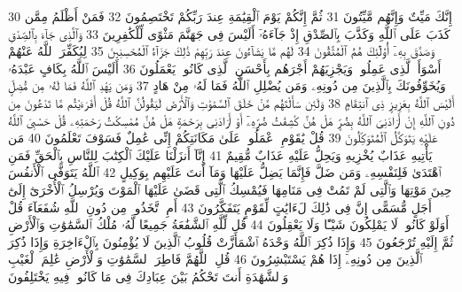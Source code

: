 {\tiny\colorbox{cl_aya}{30}} إِنَّكَ مَيِّتٌ وَإِنَّهُم مَّيِّتُونَ
{\tiny\colorbox{cl_aya}{31}} ثُمَّ إِنَّكُمْ يَوْمَ ٱلْقِيَٰمَةِ عِندَ رَبِّكُمْ تَخْتَصِمُونَ
{\tiny\colorbox{cl_aya}{32}} فَمَنْ أَظْلَمُ مِمَّن كَذَبَ عَلَى ٱللَّهِ وَكَذَّبَ بِٱلصِّدْقِ إِذْ جَآءَهُۥٓ أَلَيْسَ فِى جَهَنَّمَ مَثْوًى لِّلْكَٰفِرِينَ
{\tiny\colorbox{cl_aya}{33}} وَٱلَّذِى جَآءَ بِٱلصِّدْقِ وَصَدَّقَ بِهِۦٓ أُو۟لَٰٓئِكَ هُمُ ٱلْمُتَّقُونَ
{\tiny\colorbox{cl_aya}{34}} لَهُم مَّا يَشَآءُونَ عِندَ رَبِّهِمْ ذَٰلِكَ جَزَآءُ ٱلْمُحْسِنِينَ
{\tiny\colorbox{cl_aya}{35}} لِيُكَفِّرَ ٱللَّهُ عَنْهُمْ أَسْوَأَ ٱلَّذِى عَمِلُوا۟ وَيَجْزِيَهُمْ أَجْرَهُم بِأَحْسَنِ ٱلَّذِى كَانُوا۟ يَعْمَلُونَ
{\tiny\colorbox{cl_aya}{36}} أَلَيْسَ ٱللَّهُ بِكَافٍ عَبْدَهُۥ وَيُخَوِّفُونَكَ بِٱلَّذِينَ مِن دُونِهِۦ وَمَن يُضْلِلِ ٱللَّهُ فَمَا لَهُۥ مِنْ هَادٍ
{\tiny\colorbox{cl_aya}{37}} وَمَن يَهْدِ ٱللَّهُ فَمَا لَهُۥ مِن مُّضِلٍّ أَلَيْسَ ٱللَّهُ بِعَزِيزٍ ذِى ٱنتِقَامٍ
{\tiny\colorbox{cl_aya}{38}} وَلَئِن سَأَلْتَهُم مَّنْ خَلَقَ ٱلسَّمَٰوَٰتِ وَٱلْأَرْضَ لَيَقُولُنَّ ٱللَّهُ قُلْ أَفَرَءَيْتُم مَّا تَدْعُونَ مِن دُونِ ٱللَّهِ إِنْ أَرَادَنِىَ ٱللَّهُ بِضُرٍّ هَلْ هُنَّ كَٰشِفَٰتُ ضُرِّهِۦٓ أَوْ أَرَادَنِى بِرَحْمَةٍ هَلْ هُنَّ مُمْسِكَٰتُ رَحْمَتِهِۦ قُلْ حَسْبِىَ ٱللَّهُ عَلَيْهِ يَتَوَكَّلُ ٱلْمُتَوَكِّلُونَ
{\tiny\colorbox{cl_aya}{39}} قُلْ يَٰقَوْمِ ٱعْمَلُوا۟ عَلَىٰ مَكَانَتِكُمْ إِنِّى عَٰمِلٌ فَسَوْفَ تَعْلَمُونَ
{\tiny\colorbox{cl_aya}{40}} مَن يَأْتِيهِ عَذَابٌ يُخْزِيهِ وَيَحِلُّ عَلَيْهِ عَذَابٌ مُّقِيمٌ
{\tiny\colorbox{cl_aya}{41}} إِنَّآ أَنزَلْنَا عَلَيْكَ ٱلْكِتَٰبَ لِلنَّاسِ بِٱلْحَقِّ فَمَنِ ٱهْتَدَىٰ فَلِنَفْسِهِۦ وَمَن ضَلَّ فَإِنَّمَا يَضِلُّ عَلَيْهَا وَمَآ أَنتَ عَلَيْهِم بِوَكِيلٍ
{\tiny\colorbox{cl_aya}{42}} ٱللَّهُ يَتَوَفَّى ٱلْأَنفُسَ حِينَ مَوْتِهَا وَٱلَّتِى لَمْ تَمُتْ فِى مَنَامِهَا فَيُمْسِكُ ٱلَّتِى قَضَىٰ عَلَيْهَا ٱلْمَوْتَ وَيُرْسِلُ ٱلْأُخْرَىٰٓ إِلَىٰٓ أَجَلٍ مُّسَمًّى إِنَّ فِى ذَٰلِكَ لَءَايَٰتٍ لِّقَوْمٍ يَتَفَكَّرُونَ
{\tiny\colorbox{cl_aya}{43}} أَمِ ٱتَّخَذُوا۟ مِن دُونِ ٱللَّهِ شُفَعَآءَ قُلْ أَوَلَوْ كَانُوا۟ لَا يَمْلِكُونَ شَيْـًٔا وَلَا يَعْقِلُونَ
{\tiny\colorbox{cl_aya}{44}} قُل لِّلَّهِ ٱلشَّفَٰعَةُ جَمِيعًا لَّهُۥ مُلْكُ ٱلسَّمَٰوَٰتِ وَٱلْأَرْضِ ثُمَّ إِلَيْهِ تُرْجَعُونَ
{\tiny\colorbox{cl_aya}{45}} وَإِذَا ذُكِرَ ٱللَّهُ وَحْدَهُ ٱشْمَأَزَّتْ قُلُوبُ ٱلَّذِينَ لَا يُؤْمِنُونَ بِٱلْءَاخِرَةِ وَإِذَا ذُكِرَ ٱلَّذِينَ مِن دُونِهِۦٓ إِذَا هُمْ يَسْتَبْشِرُونَ
{\tiny\colorbox{cl_aya}{46}} قُلِ ٱللَّهُمَّ فَاطِرَ ٱلسَّمَٰوَٰتِ وَٱلْأَرْضِ عَٰلِمَ ٱلْغَيْبِ وَٱلشَّهَٰدَةِ أَنتَ تَحْكُمُ بَيْنَ عِبَادِكَ فِى مَا كَانُوا۟ فِيهِ يَخْتَلِفُونَ
